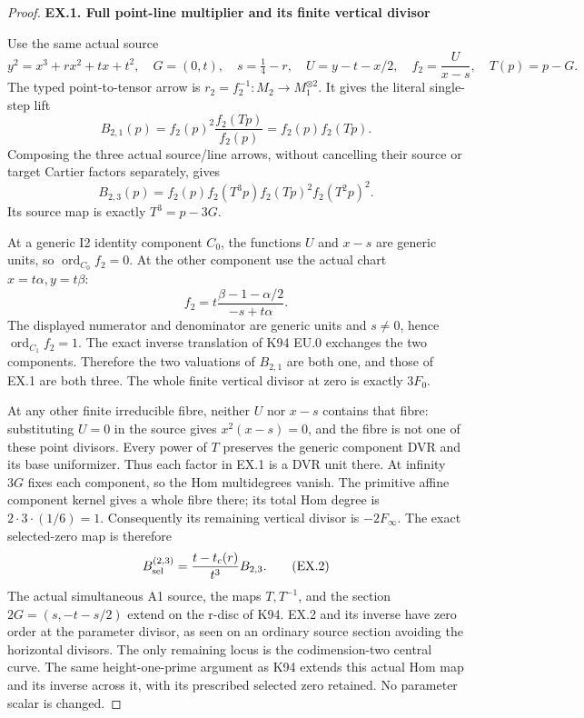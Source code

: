 \begin{proof}
\par

\medskip\noindent\textbf{EX.1. Full point-line multiplier and its finite vertical divisor}

\par\nobreak

Use the same actual source
\[
 y^2=x^3+r x^2+t x+t^2,\quad G=(0,t),\quad
 s=\tfrac14-r,\quad U=y-t-x/2,\quad
 f_2=\frac U{x-s},\quad T(p)=p-G.
\]
The typed point-to-tensor arrow is
\(r_2=f_2^{-1}:M_2\longrightarrow M_1^{\otimes2}\).
It gives the literal single-step lift
\[
 B_{2,1}(p)=f_2(p)^2\frac{f_2(Tp)}{f_2(p)}
          =f_2(p)f_2(Tp).
\]
Composing the three actual source/line arrows, without cancelling
their source or target Cartier factors separately, gives
\[
 B_{2,3}(p)=f_2(p)f_2(T^3p)f_2(Tp)^2f_2(T^2p)^2.
 \tag{EX.1}
\]
Its source map is exactly \(T^3=p-3G\).

At a generic I2 identity component \(C_0\), the functions \(U\)
and \(x-s\) are generic units, so \(\operatorname{ord}_{C_0}f_2=0\).
At the other component use the actual chart \(x=t\alpha,y=t\beta\):
\[
 f_2=t\frac{\beta-1-\alpha/2}{-s+t\alpha}.
\]
The displayed numerator and denominator are generic units and
\(s\ne0\), hence \(\operatorname{ord}_{C_1}f_2=1\).
The exact inverse translation of K94 EU.0 exchanges the two
components. Therefore the two valuations of \(B_{2,1}\) are
both one, and those of EX.1 are both three. The whole finite
vertical divisor at zero is exactly \(3F_0\).

At any other finite irreducible fibre, neither \(U\) nor \(x-s\)
contains that fibre: substituting \(U=0\) in the source gives
\(x^2(x-s)=0\), and the fibre is not one of these point divisors.
Every power of \(T\) preserves the generic component DVR and its
base uniformizer. Thus each factor in EX.1 is a DVR unit there.
At infinity \(3G\) fixes each component, so the Hom multidegrees
vanish. The primitive affine component kernel gives a whole fibre
there; its total Hom degree is \(2\cdot3\cdot(1/6)=1\).
Consequently its remaining vertical divisor is \(-2F_\infty\).
The exact selected-zero map is therefore
\[
 B^{(2,3)}_{\rm sel}=\frac{t-t_c(r)}{t^3}B_{2,3}.
 \tag{EX.2}
\]
The actual simultaneous A1 source, the maps \(T,T^{-1}\), and
the section \(2G=(s,-t-s/2)\) extend on the r-disc of K94.
EX.2 and its inverse have zero order at the parameter divisor,
as seen on an ordinary source section avoiding the horizontal
divisors. The only remaining locus is the codimension-two central
curve. The same height-one-prime argument as K94 extends this
actual Hom map and its inverse across it, with its prescribed
selected zero retained. No parameter scalar is changed.


\end{proof}

